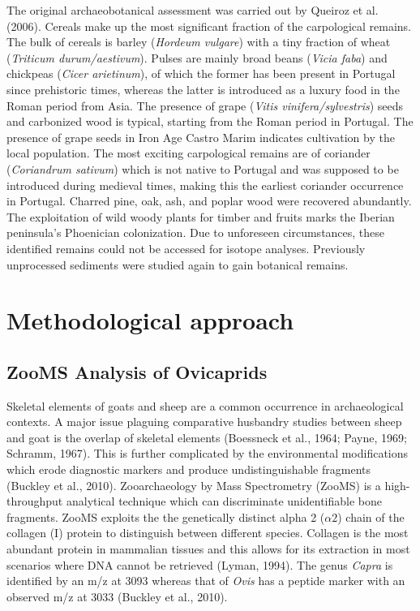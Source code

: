 \documentclass[3p]{elsarticle} %
\begin{document}
The original archaeobotanical assessment was carried out by Queiroz et al. (2006). Cereals make up the most significant fraction of the carpological remains. The bulk of cereals is barley (\emph{Hordeum vulgare}) with a tiny fraction of wheat (\emph{Triticum durum/aestivum}). Pulses are mainly broad beans (\emph{Vicia faba}) and chickpeas (\emph{Cicer arietinum}), of which the former has been present in Portugal since prehistoric times, whereas the latter is introduced as a luxury food in the Roman period from Asia. The presence of grape (\emph{Vitis vinifera/sylvestris}) seeds and carbonized wood is typical, starting from the Roman period in Portugal. The presence of grape seeds in Iron Age Castro Marim indicates cultivation by the local population. The most exciting carpological remains are of coriander (\emph{Coriandrum sativum}) which is not native to Portugal and was supposed to be introduced during medieval times, making this the earliest coriander occurrence in Portugal. Charred pine, oak, ash, and poplar wood were recovered abundantly. The exploitation of wild woody plants for timber and fruits marks the Iberian peninsula's Phoenician colonization. Due to unforeseen circumstances, these identified remains could not be accessed for isotope analyses. Previously unprocessed sediments were studied again to gain botanical remains.

\hypertarget{methodological-approach}{%
\section{Methodological approach}\label{methodological-approach}}

\hypertarget{zooms-analysis-of-ovicaprids}{%
\subsection{ZooMS Analysis of Ovicaprids}\label{zooms-analysis-of-ovicaprids}}

Skeletal elements of goats and sheep are a common occurrence in archaeological contexts. A major issue plaguing comparative husbandry studies between sheep and goat is the overlap of skeletal elements (Boessneck et al., 1964; Payne, 1969; Schramm, 1967). This is further complicated by the environmental modifications which erode diagnostic markers and produce undistinguishable fragments (Buckley et al., 2010). Zooarchaeology by Mass Spectrometry (ZooMS) is a high-throughput analytical technique which can discriminate unidentifiable bone fragments. ZooMS exploits the the genetically distinct alpha 2 (\(\alpha2\)) chain of the collagen (I) protein to distinguish between different species. Collagen is the most abundant protein in mammalian tissues and this allows for its extraction in most scenarios where DNA cannot be retrieved (Lyman, 1994). The genus \emph{Capra} is identified by an m/z at 3093 whereas that of \emph{Ovis} has a peptide marker with an observed m/z at 3033 (Buckley et al., 2010).
\end{document}
